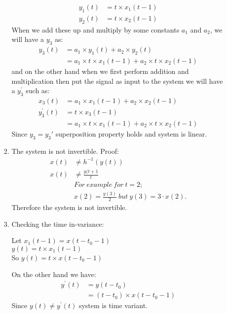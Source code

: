 \documentclass[10pt,a4paper, margin=1in]{article}
\begin{document}
\begin{enumerate}
\begin{enumerate}
\begin{enumerate}
            \begin{align*}
            y_1(t) & =t \times x_1(t-1) \\
            y_2(t) & =t \times x_2(t-1)
            \end{align*}
            When we add these up and multiply by some constants $a_1$ and $a_2$, we will have a $y_3$ as:
            \begin{align*}
            y_3(t)&= a_1 \times y_1(t) + a_2 \times y_2(t) \\
                  &= a_1 \times t \times x_1(t-1)+ a_2 \times t \times x_2(t-1)
            \end{align*}
            and on the other hand when we first perform addition and multiplication then put the signal as input to the system we will have a $y_3^{'}$ such as:
            \begin{align*}
                x_3(t)&=a_1\times x_1(t-1) + a_2\times x_2(t-1) \\
                y_3^{'}(t)&=t \times x_3(t-1)\\
                &=a_1\times t \times x_1(t-1) + a_2\times t \times x_2(t-1)
            \end{align*}
            Since $y_3 = y_3'$ superposition property holds and system is linear.
        \item The system is not invertible. Proof:
        \begin{align*}
        x(t) &\neq h^{-1}(y(t)) \\
        x(t) &\neq \frac{y(t+1}{t}\\
        &For\ example\ for\ t=2;\\
        &x(2)=\frac{y(3)}{2}\ but\ y(3)=3\cdot x(2).
        \end{align*}Therefore the system is not invertible.
         \item Checking the time in-variance:
        \begin{center}
        Let $x_1(t-1) = x(t-t_0-1)$ \\
         $y(t)=t \times x_1(t-1)$ \\
        So $y(t) = t \times x(t - t_0-1)$
        \end{center}
        On the other hand we have:
        \begin{align*}
        y^{'}(t) &= y(t-t_0) \\
        &= (t - t_0) \times x(t-t_0-1)
        \end{align*}
        Since $y(t) \neq y^{'}(t)$ system is time variant. \\

\end{enumerate}
\end{enumerate}
\end{enumerate}
\end{document}

